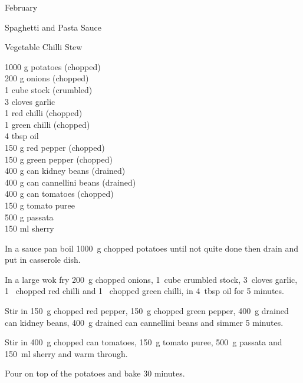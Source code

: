 \begin{menu}{February}
\begin{recipe}{2}{Spaghetti and Pasta Sauce}
\begin{instructions}
    \end{instructions}
    \end{recipe}%
  
    \begin{recipe}{2}{Vegetable Chilli Stew}%
		\begin{ingredients}
		1000 g potatoes (chopped) \\
	200 g onions (chopped) \\
	1 cube stock (crumbled) \\
	3 cloves garlic  \\
	1  red chilli (chopped) \\
	1  green chilli (chopped) \\
	4 tbsp oil  \\
	150 g red pepper (chopped) \\
	150 g green pepper (chopped) \\
	400 g can kidney beans (drained) \\
	400 g can cannellini beans (drained) \\
	400 g can tomatoes (chopped) \\
	150 g tomato puree  \\
	500 g passata  \\
	150 ml sherry  \\
	
		\end{ingredients}
	
	
    \begin{instructions}
    \item 
        In a sauce pan boil
        1000~g chopped potatoes
        until not quite done
        then drain and put in casserole dish.
      \item 
        In a large wok fry
        200~g chopped onions,
        1~cube crumbled stock,
        3~cloves  garlic,
        1~ chopped red chilli
        and
        1~ chopped green chilli,
        in
        4~tbsp  oil
        for 5 minutes.
      \item 
        Stir in
        150~g chopped red pepper,
        150~g chopped green pepper,
        400~g drained can kidney beans,
        400~g drained can cannellini beans
        and simmer 5 minutes.
      \item 
        Stir in
        400~g chopped can tomatoes,
        150~g  tomato puree,
        500~g  passata
        and
        150~ml  sherry
        and warm through.
      \item 
        Pour on top of the potatoes
        and bake 30 minutes.
      

\end{instructions}
\end{recipe}
\end{menu}
